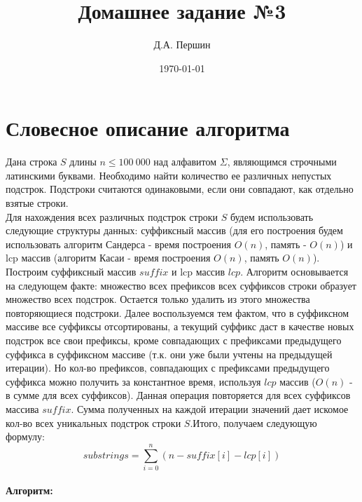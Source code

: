 \documentclass[12pt]{article}
\title{\bf Домашнее задание №3}
\author{Д.А. Першин}
\date{\today}
\begin{document}
\maketitle


\section{Словесное описание алгоритма}

Дана строка $S$ длины $n \leq 100\ 000$ над алфавитом $\Sigma$, являющимся строчными латинскими буквами. Необходимо найти количество ее различных непустых подстрок. Подстроки считаются одинаковыми, если они совпадают, как отдельно взятые строки.\\

Для нахождения всех различных подстрок строки $S$ будем использовать следующие структуры данных: суффиксный массив (для его построения будем использовать алгоритм Сандерса - время построения $O(n)$, память - $O(n)$) и lcp массив (алгоритм Касаи - время построения $O(n)$, память $O(n)$).\\

Построим суффиксный массив $suffix$ и lcp массив $lcp$. Алгоритм основывается на следующем факте: множество всех префиксов всех суффиксов строки образует множество всех подстрок. Остается только удалить из этого множества повторяющиеся подстроки. Далее воспользуемся тем фактом, что в суффиксном массиве все суффиксы отсортированы, а текущий суффикс даст в качестве новых подстрок все свои префиксы, кроме совпадающих с префиксами предыдущего суффикса в суффиксном массиве (т.к. они уже были учтены на предыдущей итерации). Но кол-во префиксов, совпадающих с префиксами предыдущего суффикса можно получить за константное время, используя $lcp$ массив ($O(n)$ - в сумме для всех суффиксов). Данная операция повторяется для всех суффиксов массива $suffix$. Сумма полученных на каждой итерации значений дает искомое кол-во всех уникальных подстрок строки $S$.Итого, получаем следующую формулу:
$$substrings =\sum_{i=0}^n (n - suffix[i] - lcp[i])$$

\newpage



\paragraph{Алгоритм:}
\end{document}
